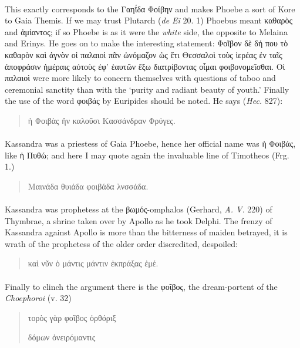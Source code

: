 \documentclass[a4paper, 11pt, oneside, polutonikogreek, english]{article}
\begin{document}
\paragraph{}
This exactly corresponds to the Γαηΐδα Φοίβην and makes Phoebe a sort of Kore to Gaia Themis. If we may trust Plutarch (\emph{de Ei} 20. 1) Phoebus meant καθαρὸς and ἀμίαντος; if so Phoebe is as it were the \emph{white} side, the opposite to Melaina and Erinys. He goes on to make the interesting statement: Φοῖβον δὲ δή που τὸ καθαρὸν καὶ ἁγνὸν οἱ παλαιοὶ πᾶν ὠνόμαζον ὡς ἔτι Θεσσαλοὶ τοὺς ἱερέας ἐν ταῖς ἀποφράσιν ἡμέραις αὐτοὺς ἐφ' ἑαυτῶν ἔξω διατρίβοντας οἶμαι φοιβονομεῖσθαι. Οἱ παλαιοὶ were more likely to concern themselves with questions of taboo and ceremonial sanctity than with the `purity and radiant beauty of youth.' Finally the use of the word φοιβάς by Euripides should be noted. He says (\emph{Hec.} 827):
\begin{quotation}
ἡ Φοιβὰς ἣν καλοῦσι Κασσάνδραν Φρύγες.
\end{quotation}
\paragraph{}
Kassandra was a priestess of Gaia Phoebe, hence her official name was ἡ Φοιβάς, like ἡ Πυθώ; and here I may quote again the invaluable line of Timotheos (Frg. 1.)
\begin{quotation}
Μαινάδα θυιάδα φοιβάδα λνσσάδα.
\end{quotation}
\paragraph{}
Kassandra was prophetess at the βωμός-omphalos (Gerhard, \emph{A. V.} 220) of Thymbrae, a shrine taken over by Apollo as he took Delphi. The frenzy of Kassandra against Apollo is more than the bitterness of maiden betrayed, it is wrath of the prophetess of the older order discredited, despoiled:
\begin{quotation}
καὶ νῦν ὀ μάντις μάντιν ἐκπράξας ἐμέ.
\end{quotation}
\paragraph{}
Finally to clinch the argument there is the φοῖβος, the dream-portent of the \emph{Choephoroi} (v. 32)
\begin{quotation}
τορὸς γὰρ φοῖβος ὀρθόριξ

δόμων ὀνειρόμαντις
\end{quotation}
\end{document}
